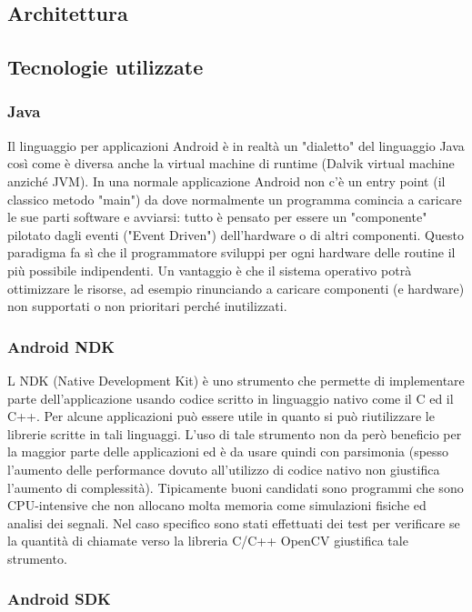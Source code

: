 \subsection{Architettura}
\subsection{Tecnologie utilizzate}

\subsubsection{Java}

Il linguaggio per applicazioni Android è in realtà un "dialetto" del linguaggio Java così come è diversa anche la virtual machine di runtime (Dalvik virtual machine anziché JVM).
In una normale applicazione Android non c'è un entry point (il classico metodo "main") da dove normalmente un programma comincia a caricare le sue parti software e avviarsi: tutto è pensato per essere un "componente" pilotato dagli eventi ("Event Driven") dell'hardware o di altri componenti. Questo paradigma fa sì che il programmatore sviluppi per ogni hardware delle routine il più possibile indipendenti. Un vantaggio è che il sistema operativo potrà ottimizzare le risorse, ad esempio rinunciando a caricare componenti (e hardware) non supportati o non prioritari perché inutilizzati.


\subsubsection{Android NDK}

L NDK (Native Development Kit) è uno strumento che permette di implementare parte dell'applicazione usando codice scritto in linguaggio nativo come il C ed il C++. Per alcune applicazioni può essere utile in quanto si può riutilizzare le librerie scritte in tali linguaggi. L'uso di tale strumento non da però beneficio per la maggior parte delle applicazioni ed è da usare quindi con parsimonia (spesso l'aumento delle performance dovuto all'utilizzo di codice nativo non giustifica l'aumento di complessità). Tipicamente buoni candidati sono programmi che sono CPU-intensive che non allocano molta memoria come simulazioni fisiche ed analisi dei segnali. Nel caso specifico sono stati effettuati dei test per verificare se la quantità di chiamate verso la libreria C/C++ OpenCV giustifica tale strumento. 

\subsubsection{Android SDK}

